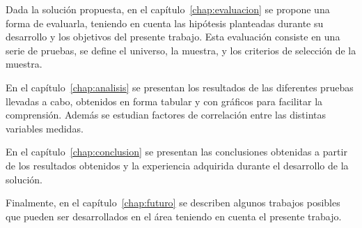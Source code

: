 
Dada la solución propuesta, en el capítulo~\ref{chap:evaluacion} se propone una
forma de evaluarla, teniendo en cuenta las hipótesis planteadas durante su
desarrollo  y los objetivos del presente trabajo. Esta evaluación consiste en
una serie de pruebas, se define el universo, la muestra, y los criterios de
selección de la muestra.


En el capítulo~\ref{chap:analisis} se presentan los resultados de las diferentes
pruebas llevadas a cabo, obtenidos en forma tabular y con gráficos para
facilitar la comprensión. Además se estudian factores de correlación entre las
distintas variables medidas.


En el capítulo~\ref{chap:conclusion} se presentan las
conclusiones obtenidas a partir de los resultados obtenidos y la experiencia
adquirida durante el desarrollo de la solución.


Finalmente, en el capítulo~\ref{chap:futuro} se describen algunos trabajos posibles que pueden
ser desarrollados en el área teniendo en cuenta el presente trabajo. 

